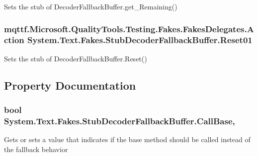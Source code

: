 Sets the stub of Decoder\-Fallback\-Buffer.\-get\-\_\-\-Remaining()

\hypertarget{class_system_1_1_text_1_1_fakes_1_1_stub_decoder_fallback_buffer_ae4431d799d1c0c59dd1c58fb489e7e06}{
\subsubsection[{Reset01}]{\setlength{\rightskip}{0pt plus 5cm}mqttf.\-Microsoft.\-Quality\-Tools.\-Testing.\-Fakes.\-Fakes\-Delegates.\-Action System.\-Text.\-Fakes.\-Stub\-Decoder\-Fallback\-Buffer.\-Reset01}}\label{class_system_1_1_text_1_1_fakes_1_1_stub_decoder_fallback_buffer_ae4431d799d1c0c59dd1c58fb489e7e06}


Sets the stub of Decoder\-Fallback\-Buffer.\-Reset()



\subsection{Property Documentation}
\hypertarget{class_system_1_1_text_1_1_fakes_1_1_stub_decoder_fallback_buffer_ac482e51f6e54954b7484de7d2730bb92}{
\subsubsection[{Call\-Base}]{\setlength{\rightskip}{0pt plus 5cm}bool System.\-Text.\-Fakes.\-Stub\-Decoder\-Fallback\-Buffer.\-Call\-Base\hspace{0.3cm}{\ttfamily [get]}, {\ttfamily [set]}}}\label{class_system_1_1_text_1_1_fakes_1_1_stub_decoder_fallback_buffer_ac482e51f6e54954b7484de7d2730bb92}


Gets or sets a value that indicates if the base method should be called instead of the fallback behavior

